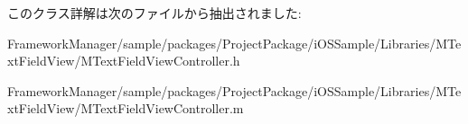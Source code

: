 このクラス詳解は次のファイルから抽出されました\+:\begin{DoxyCompactItemize}
\item 
Framework\+Manager/sample/packages/\+Project\+Package/i\+O\+S\+Sample/\+Libraries/\+M\+Text\+Field\+View/M\+Text\+Field\+View\+Controller.\+h\item 
Framework\+Manager/sample/packages/\+Project\+Package/i\+O\+S\+Sample/\+Libraries/\+M\+Text\+Field\+View/M\+Text\+Field\+View\+Controller.\+m\end{DoxyCompactItemize}
